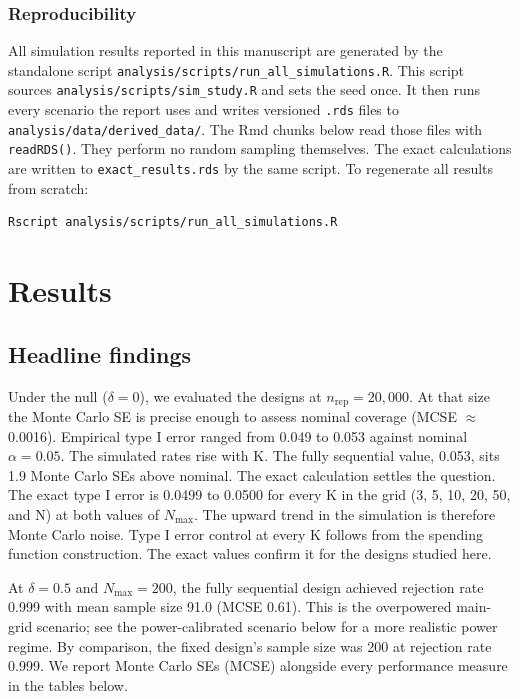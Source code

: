 \documentclass[
  11pt,
]{article}
\begin{document}
\subsubsection{Reproducibility}\label{reproducibility}

All simulation results reported in this manuscript are
generated by the standalone script
\texttt{analysis/scripts/run\_all\_simulations.R}. This script
sources \texttt{analysis/scripts/sim\_study.R} and sets the
seed once. It then runs every scenario the report uses
and writes versioned \texttt{.rds} files to
\texttt{analysis/data/derived\_data/}. The Rmd chunks below
read those files with \texttt{readRDS()}. They perform no
random sampling themselves. The exact calculations are
written to \texttt{exact\_results.rds} by the same script. To
regenerate all results from scratch:

\begin{verbatim}
Rscript analysis/scripts/run_all_simulations.R
\end{verbatim}

\section{Results}\label{results}

\subsection{Headline findings}\label{headline-findings}

Under the null (\(\delta = 0\)), we evaluated the designs
at \(n_{\mathrm{rep}} = 20{,}000\). At that size the Monte
Carlo SE is precise enough to assess nominal coverage
(MCSE \(\approx\)
0.0016).
Empirical type I error ranged from
0.049
to 0.053
against nominal \(\alpha = 0.05\). The simulated rates
rise with K. The fully sequential value,
0.053,
sits
1.9
Monte Carlo SEs above nominal. The exact calculation
settles the question. The exact type I error is
0.0499
to
0.0500
for every K in the grid (3, 5, 10, 20, 50, and N) at
both values of \(N_{\max}\). The upward trend in the
simulation is therefore Monte Carlo noise. Type I
error control at every K follows from the spending
function construction. The exact values confirm it for
the designs studied here.

At \(\delta = 0.5\) and \(N_{\max} = 200\), the fully
sequential design achieved rejection rate
0.999
with mean sample size
91.0
(MCSE
0.61).
This is the overpowered main-grid scenario; see the
power-calibrated scenario below for a more realistic
power regime. By comparison, the fixed design's sample
size was
200
at rejection rate
0.999.
We report Monte Carlo SEs (MCSE) alongside every
performance measure in the tables below.
\end{document}
